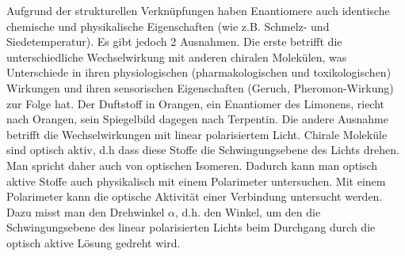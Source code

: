 \documentclass{scrartcl}  %
\begin{document}
\begin{tcolorbox}
				Aufgrund der strukturellen Verknüpfungen haben Enantiomere auch identische chemische und physikalische Eigenschaften (wie z.B. Schmelz- und Siedetemperatur). Es gibt jedoch 2 Ausnahmen. \newline
				Die erste betrifft die unterschiedliche Wechselwirkung mit anderen chiralen Molekülen, was Unterschiede in ihren physiologischen (pharmakologischen und toxikologischen) Wirkungen und ihren sensorischen Eigenschaften (Geruch, Pheromon-Wirkung) zur Folge hat. Der Duftstoff in Orangen, ein Enantiomer des Limonens, riecht nach Orangen, sein Spiegelbild dagegen nach Terpentin. \newline 
				Die andere Ausnahme betrifft die Wechselwirkungen mit linear polarisiertem Licht. Chirale Moleküle sind optisch aktiv, d.h dass diese Stoffe die Schwingungsebene des Lichts drehen. Man spricht daher auch von optischen Isomeren. Dadurch kann man optisch aktive Stoffe auch physikalisch mit einem Polarimeter untersuchen.\newline 
				Mit einem Polarimeter kann die optische Aktivität  einer Verbindung untersucht werden. Dazu misst man den Drehwinkel $\alpha$, d.h. den Winkel, um den die Schwingungsebene des linear polarisierten Lichts beim Durchgang durch die optisch aktive Lösung gedreht wird.
			\end{tcolorbox}			
			
\end{document}
